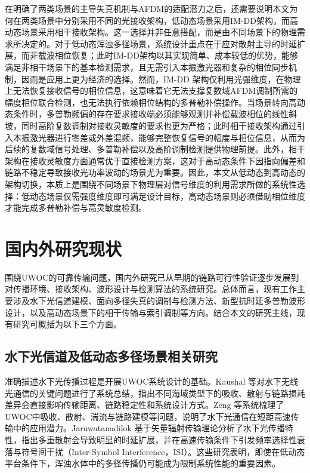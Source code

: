 在明确了两类场景的主导失真机制与AFDM的适配潜力之后，还需要说明本文为何在两类场景中分别采用不同的光接收架构，低动态场景采用IM-DD架构，而高动态场景采用相干接收架构。这一选择并非任意搭配，而是由不同场景下的物理需求所决定的。对于低动态浑浊多径场景，系统设计重点在于应对散射主导的时延扩展，而非载波相位恢复；此时IM-DD架构以其实现简单、成本较低的优势，能够满足非相干场景下的基本检测需求，且无需引入本振激光器和复杂的相位同步机制，因而是应用上更为经济的选择。然而，IM-DD 架构仅利用光强维度，在物理上无法恢复接收信号的相位信息，这意味着它无法支撑复数域AFDM调制所需的幅度相位联合检测，也无法执行依赖相位结构的多普勒补偿操作。当场景转向高动态条件时，多普勒频偏的存在要求接收端必须能够观测并补偿载波相位的线性斜坡，同时高阶复数调制对接收灵敏度的要求也更为严格；此时相干接收架构通过引入本振激光器进行零差或外差混频，能够完整恢复信号的幅度与相位信息，从而为后续的复数域信号处理、多普勒补偿以及高阶调制检测提供物理前提\cite{guiomarCoherentFreeSpaceOptical2022, huPerformanceCoherentOptical2025}。此外，相干架构在接收灵敏度方面通常优于直接检测方案，这对于高动态条件下因指向偏差和链路不稳定导致接收光功率波动的场景尤为重要。因此，本文从低动态到高动态的架构切换，本质上是围绕不同场景下物理层对信号维度的利用需求所做的系统性选择：低动态场景仅需强度维度即可满足设计目标，高动态场景则必须借助相位维度才能完成多普勒补偿与高灵敏度检测。

\section{国内外研究现状}
\label{sec:research_status}

围绕UWOC的可靠传输问题，国内外研究已从早期的链路可行性验证逐步发展到对传播环境、接收架构、波形设计与检测算法的系统研究。总体而言，现有工作主要涉及水下光信道建模、面向多径失真的调制与检测方法、新型抗时延多普勒波形设计，以及高动态场景下的相干传输与索引调制等方向。结合本文的研究主线，现有研究可概括为以下三个方面。

\subsection{水下光信道及低动态多径场景相关研究}
\label{subsec:status_modulation}

准确描述水下光传播过程是开展UWOC系统设计的基础。Kaushal 等对水下无线光通信的关键问题进行了系统总结，指出不同海域类型下的吸收、散射与链路损耗差异会直接影响传输距离、链路稳定性和系统设计方式\cite{kaushalUnderwaterOpticalWireless2016a}。Zeng 等系统梳理了UWOC中吸收、散射、湍流与链路建模等问题，说明了水下光通信在短距高速传输中的应用潜力\cite{zengSurveyUnderwaterOptical2017}。Jaruwatanadilok 基于矢量辐射传输理论分析了水下光传播特性，指出多重散射会导致明显的时延扩展，并在高速传输条件下引发频率选择性衰落与符号间干扰（Inter-Symbol Interference，ISI）\cite{jaruwatanadilokUnderwaterWirelessOptical2008}。这些研究表明，即使在低动态平台条件下，浑浊水体中的多径传播仍可能成为限制系统性能的重要因素。

